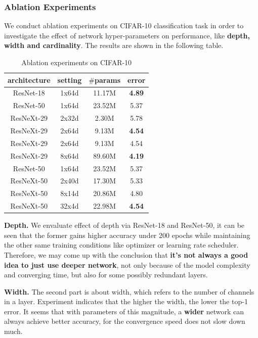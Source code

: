 \documentclass[a4paper, 11pt]{article} %
\begin{document}
\subsubsection{\textbf{Ablation Experiments}}

We conduct ablation experiments on CIFAR-10 classification task in order to investigate
the effect of network hyper-parameters on performance, like
\textbf{depth, width and cardinality}. The results are shown in the following table.

\begin{table}[H]
	\centering
	\begin{tabular}{cccc}
		\toprule
		architecture & setting & $\#$params & error         \\
		\midrule
		ResNet-18    & 1x64d   & 11.17M     & \textbf{4.89} \\
		ResNet-50    & 1x64d   & 23.52M     & 5.37          \\
		\midrule
		ResNeXt-29   & 2x32d   & 2.30M      & 5.78          \\
		ResNeXt-29   & 2x64d   & 9.13M      & \textbf{4.54} \\
		\midrule
		ResNeXt-29   & 2x64d   & 9.13M      & 4.54          \\
		ResNeXt-29   & 8x64d   & 89.60M     & \textbf{4.19} \\
		\midrule
		ResNet-50    & 1x64d   & 23.52M     & 5.37          \\
		ResNeXt-50   & 2x40d   & 17.30M     & 5.33          \\
		ResNeXt-50   & 8x14d   & 20.86M     & 4.80          \\
		ResNeXt-50   & 32x4d   & 22.98M     & \textbf{4.54} \\
		\bottomrule
	\end{tabular}
	\caption{Ablation experiments on CIFAR-10}
	\label{tab:ablation}
\end{table}

\textbf{Depth.} We envaluate effect of depth via ResNet-18 and ResNet-50, it can be seen
that the former gains higher accuracy under 200 epochs while maintaining the other same
training conditions like optimizer or learning rate scheduler. Therefore, we may come up
with the conclusion that \textbf{it's not always a good idea to just use deeper network},
not only because of the model complexity and converging time, but also for some possibly
redundant layers.

\textbf{Width.} The second part is about width, which refers to the number of channels in
a layer. Experiment indicates that the higher the width, the lower the top-1 error. It
seems that with parameters of this magnitude, a \textbf{wider} network can always achieve
better accuracy, for the convergence speed does not slow down much.
\end{document}
